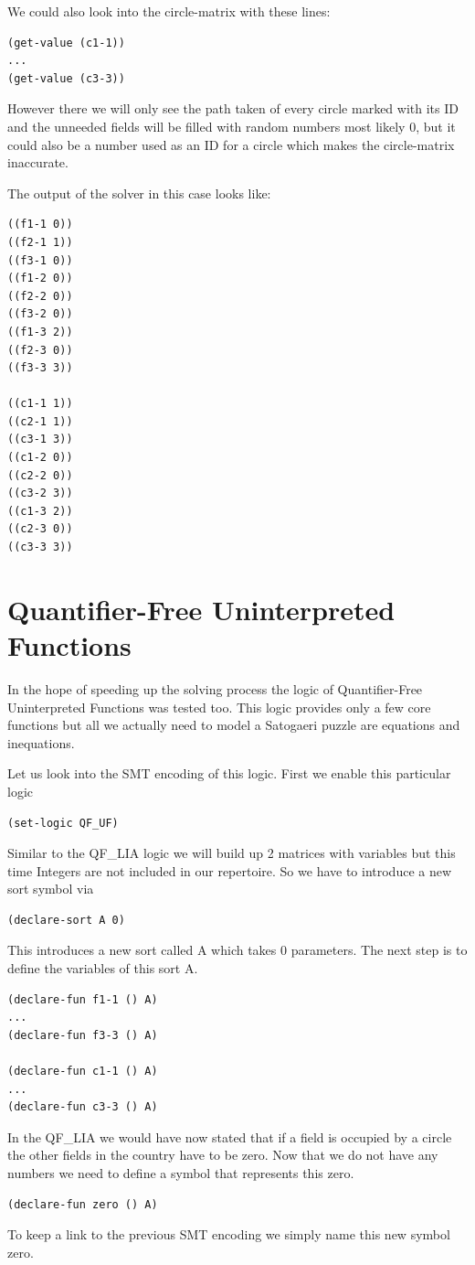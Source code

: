 We could also look into the circle-matrix with these lines:
\begin{lstlisting}
(get-value (c1-1))
...
(get-value (c3-3))
\end{lstlisting}
However there we will only see the path taken of every circle marked with its ID and the unneeded fields will be filled with random numbers most likely 0, but it could also be a number used as an ID for a circle which makes the circle-matrix inaccurate.

The output of the solver in this case looks like:
\begin{lstlisting}
((f1-1 0))
((f2-1 1))
((f3-1 0))
((f1-2 0))
((f2-2 0))
((f3-2 0))
((f1-3 2))
((f2-3 0))
((f3-3 3))

((c1-1 1))
((c2-1 1))
((c3-1 3))
((c1-2 0))
((c2-2 0))
((c3-2 3))
((c1-3 2))
((c2-3 0))
((c3-3 3))
\end{lstlisting}

\section{Quantifier-Free Uninterpreted Functions}
In the hope of speeding up the solving process the logic of Quantifier-Free Uninterpreted Functions was tested too. This logic provides only a few core functions but all we actually need to model a Satogaeri puzzle are equations and inequations.

Let us look into the SMT encoding of this logic. First we enable this particular logic
\begin{lstlisting}
(set-logic QF_UF)
\end{lstlisting}
 
Similar to the QF\_LIA logic we will build up 2 matrices with variables but this time Integers are not included in our repertoire. So we have to introduce a new sort symbol via
\begin{lstlisting}
(declare-sort A 0)
\end{lstlisting}
This introduces a new sort called A which takes 0 parameters. The next step is to define the variables of this sort A.
\begin{lstlisting}
(declare-fun f1-1 () A)
...
(declare-fun f3-3 () A)

(declare-fun c1-1 () A)
...
(declare-fun c3-3 () A)
\end{lstlisting}

In the QF\_LIA we would have now stated that if a field is occupied by a circle the other fields in the country have to be zero. Now that we do not have any numbers we need to define a symbol that represents this zero.
\begin{lstlisting}
(declare-fun zero () A)
\end{lstlisting}
To keep a link to the previous SMT encoding we simply name this new symbol zero.

